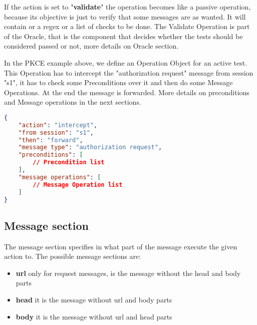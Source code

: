 If the action is set to "\textbf{validate}" the operation becomes like a passive operation, because its objective is just to verify that some messages are as wanted. It will contain or a regex or a list of checks to be done. The Validate Operation is part of the Oracle, that is the component that decides whether the tests should be considered passed or not, more details on Oracle section.

In the PKCE example above, we define an Operation Object for an active test. This Operation has to intercept the "authorization request" message from session "s1", it has to check some Preconditions over it and then do some Message Operations. At the end the message is forwarded. More details on preconditions and Message operations in the next sections.

\begin{lstlisting}[language=json, caption=Operation definition]
{
    "action": "intercept",
    "from session": "s1",
    "then": "forward",
    "message type": "authorization request",
    "preconditions": [
        // Precondition list
    ],
    "message operations": [
        // Message Operation list
    ]
}
\end{lstlisting}

\subsection{Message section}
The message section specifies in what part of the message execute the given action to. The possible message sections are:
\begin{itemize}
    \item \textbf{url} only for request messages, is the message without the head and body parts
    \item \textbf{head} it is the message without url and body parts
    \item \textbf{body} it is the message without url and head parts
\end{itemize}

